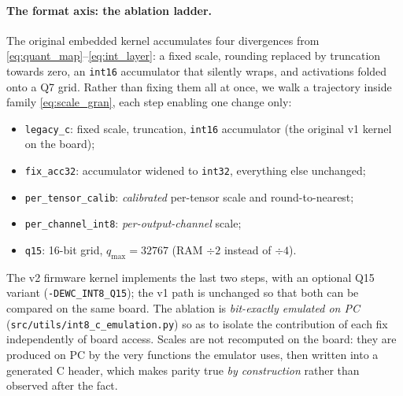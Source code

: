\paragraph{The format axis: the ablation ladder.} The original embedded kernel accumulates four
divergences from \eqref{eq:quant_map}--\eqref{eq:int_layer}: a fixed scale, rounding replaced by
truncation towards zero, an \texttt{int16} accumulator that silently wraps, and activations folded onto
a Q7 grid. Rather than fixing them all at once, we walk a trajectory inside family
\eqref{eq:scale_gran}, each step enabling one change only:
\begin{itemize}
  \item \texttt{legacy\_c}: fixed scale, truncation, \texttt{int16} accumulator (the original v1 kernel
        on the board);
  \item \texttt{fix\_acc32}: accumulator widened to \texttt{int32}, everything else unchanged;
  \item \texttt{per\_tensor\_calib}: \emph{calibrated} per-tensor scale and round-to-nearest;
  \item \texttt{per\_channel\_int8}: \emph{per-output-channel} scale;
  \item \texttt{q15}: 16-bit grid, $q_{\max} = 32767$ (RAM $\div 2$ instead of $\div 4$).
\end{itemize}
The v2 firmware kernel implements the last two steps, with an optional Q15 variant
(\texttt{-DEWC\_INT8\_Q15}); the v1 path is unchanged so that both can be compared on the same board.
The ablation is \emph{bit-exactly emulated on PC} (\texttt{src/utils/int8\_c\_emulation.py}) so as to
isolate the contribution of each fix independently of board access. Scales are not recomputed on the
board: they are produced on PC by the very functions the emulator uses, then written into a generated C
header, which makes parity true \emph{by construction} rather than observed after the fact.

